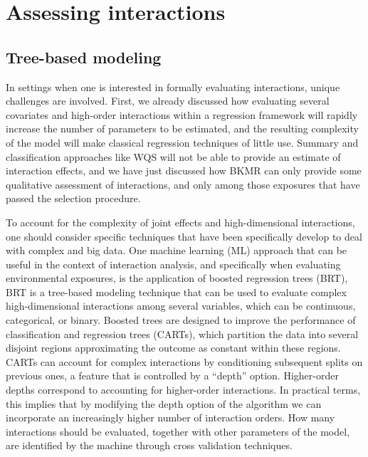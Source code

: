 \documentclass[
]{book}
\begin{document}
\hypertarget{assessing-interactions}{%
\section{Assessing interactions}\label{assessing-interactions}}

\hypertarget{tree-based-modeling}{%
\subsection{Tree-based modeling}\label{tree-based-modeling}}

In settings when one is interested in formally evaluating interactions, unique challenges are involved. First, we already discussed how evaluating several covariates and high-order interactions within a regression framework
will rapidly increase the number of parameters to be estimated, and the
resulting complexity of the model will make classical regression techniques
of little use. Summary and classification approaches like WQS will not be able to provide an estimate of interaction effects, and we have just discussed how BKMR can only provide some qualitative assessment of interactions, and only among those exposures that have passed the selection procedure.

To account for the complexity of joint effects and high-dimensional interactions, one should consider specific techniques that have been specifically develop to deal with complex and big data. One machine learning (ML) approach that can be useful in the context of interaction analysis, and specifically when evaluating environmental exposures, is the application of boosted regression trees (BRT), BRT is a tree-based modeling technique that can be used to evaluate complex high-dimensional interactions
among several variables, which can be continuous, categorical, or binary. Boosted trees are
designed to improve the performance of classification and regression
trees (CARTs), which partition the data into several disjoint regions
approximating the outcome as constant within these regions. CARTs can
account for complex interactions by conditioning subsequent splits on
previous ones, a feature that is controlled by a ``depth'' option.
Higher-order depths correspond to accounting for higher-order interactions. In practical terms, this implies that by modifying the depth option of the algorithm we can incorporate an increasingly higher number of interaction orders. How many interactions should be evaluated, together with other parameters of the model, are identified by the machine through cross validation techniques.
\end{document}
